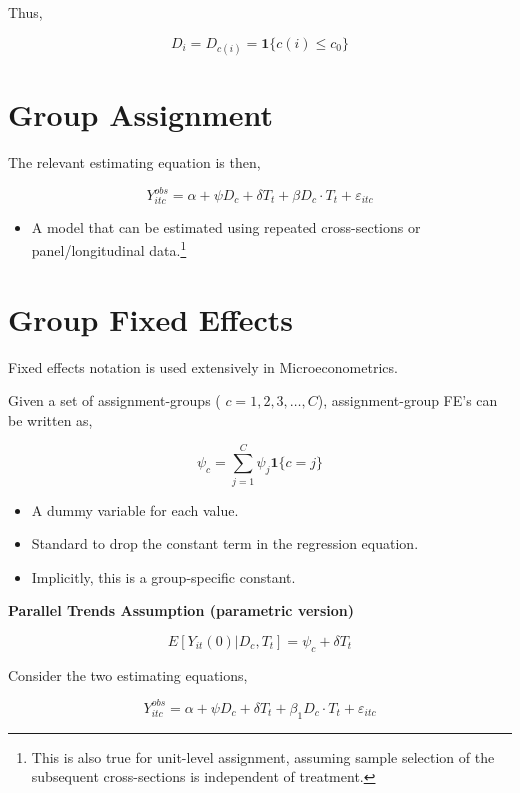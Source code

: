 \documentclass[
  letterpaper,
  DIV=11,
  numbers=noendperiod]{scrreprt}
\providecommand{\tightlist}{%
  \setlength{\itemsep}{0pt}\setlength{\parskip}{0pt}}\usepackage{longtable,booktabs,array}
\theoremstyle{definition}
\theoremstyle{remark}
\begin{document}
\begin{enumerate}
  Thus,

  \[
  D_i = D_{c(i)} = \mathbf{1}\{c(i) \leq c_0\}
  \]

  \section{Group Assignment}\label{group-assignment}

  The relevant estimating equation is then,

  \[
  Y^{obs}_{itc} = \alpha + \psi D_{c} + \delta T_t + \beta D_{c} \cdot T_t + \varepsilon_{itc}
  \]

  \begin{itemize}
  \tightlist
  \item
    A model that can be estimated using repeated cross-sections or
    panel/longitudinal data.\footnote{This is also true for unit-level
      assignment, assuming sample selection of the subsequent
      cross-sections is independent of treatment.}
  \end{itemize}

  \section{Group Fixed Effects}\label{group-fixed-effects}

  Fixed effects notation is used extensively in Microeconometrics.

  Given a set of assignment-groups ( \(c = 1, 2, 3, \ldots, C\)),
  assignment-group FE's can be written as,

  \[
  \psi_c = \sum_{j=1}^{C} \psi_j \mathbf{1}\{c = j\}
  \]

  \begin{itemize}
  \tightlist
  \item
    A dummy variable for each value.
  \item
    Standard to drop the constant term in the regression equation.
  \item
    Implicitly, this is a group-specific constant.
  \end{itemize}

  \textbf{Parallel Trends Assumption (parametric version)}

  \[
  E[Y_{it}(0)|D_c,T_t] = \psi_c + \delta T_t
  \]

  Consider the two estimating equations,

  \[
  Y^{obs}_{itc} = \alpha + \psi D_c + \delta T_t + \beta_1 D_c \cdot T_t + \varepsilon_{itc}
  \]


\end{enumerate}
\end{document}
